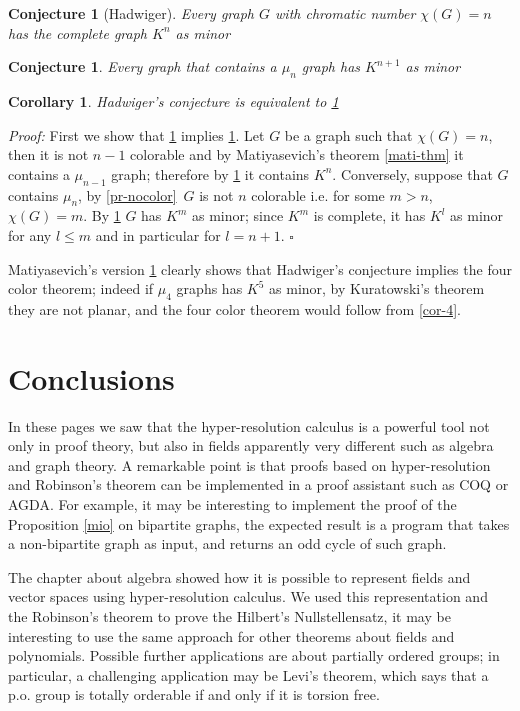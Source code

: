 \documentclass[a4paper,12pt,oneside]{book}
\newtheorem{corollary}[theorem]{Corollary}
\newtheorem{conjecture}[theorem]{Conjecture}
\newcommand*{\QED}{\hfill\ensuremath{\square}}
\begin{document}
\begin{conjecture}[Hadwiger]\label{hadw}
Every graph $G$ with chromatic number $\chi (G)=n$ has the complete graph $K^n$  as minor \end{conjecture}

\begin{conjecture}\label{hadw_mu}
Every graph that contains a $\mu_n$ graph has $K^{n+1}$  as minor \end{conjecture}

\begin{corollary}
Hadwiger's conjecture is equivalent to \ref{hadw_mu}\end{corollary}
\textit{Proof:} First we show that \ref{hadw_mu} implies \ref{hadw}. Let $G$ be a graph such that $\chi (G)=n$, then it is not $n-1$ colorable and by Matiyasevich's theorem \ref{mati-thm} it contains a $\mu_{n-1}$ graph; therefore by \ref{hadw_mu} it contains $K^n$.
Conversely, suppose that $G$ contains $\mu_n$, by \ref{pr-nocolor} $\,G$ is not $n$ colorable i.e. for some $m>n$, $\chi (G)=m$. By \ref{hadw} $G$ has $K^m$ as minor; since $K^m$ is complete, it has $K^l$ as minor for any $l\leq m$ and in particular for $l=n+1$. \QED

\noindent Matiyasevich's version \ref{hadw_mu} clearly shows  that Hadwiger's conjecture implies the four color theorem; indeed if $\mu_4$ graphs has $K^5$ as minor, by Kuratowski's theorem they are not planar, and the four color theorem would follow from \ref{cor-4}.


\chapter*{Conclusions}

In these pages we saw that the hyper-resolution calculus is a powerful tool not only in proof theory, but also in fields apparently very different such as algebra and graph theory. 
A remarkable point is that proofs based on hyper-resolution and Robinson's theorem can be implemented in a  proof assistant such as \textsc{COQ} or \textsc{AGDA}.
For example, it may be interesting to implement the proof of the Proposition \ref{mio} on bipartite graphs, the expected result is a program that takes a non-bipartite graph as input, and returns an odd cycle of such graph.

The chapter about algebra showed how it is possible to represent fields and vector spaces using hyper-resolution calculus. We used this representation and the Robinson's theorem to prove the Hilbert's Nullstellensatz, it may be interesting to use the same approach for other theorems about fields and polynomials.
Possible further applications are about partially ordered groups; in particular, a challenging application may be Levi's theorem, which says that a p.o. group is totally orderable if and only if it is torsion free\cite{fuchs}. 
\end{document}
